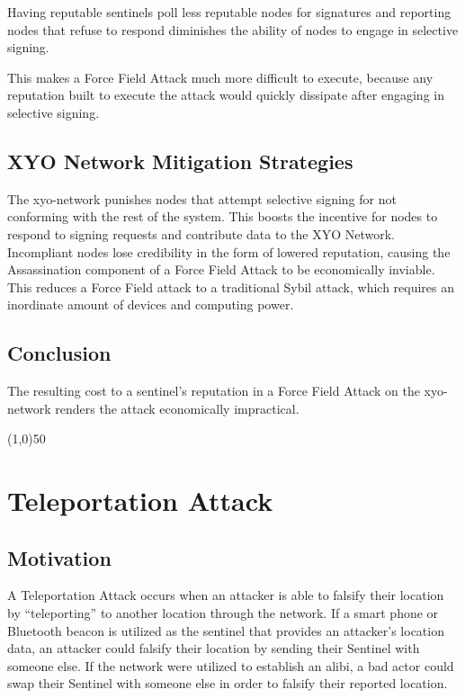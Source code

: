 \documentclass{article}
\begin{document}
Having reputable \Glspl{sentinel} poll less reputable nodes for signatures and reporting nodes that refuse to respond diminishes the ability of nodes to engage in selective signing.

This makes a Force Field Attack much more difficult to execute, because any reputation built to execute the attack would quickly dissipate after engaging in selective signing.

\subsection{XYO Network Mitigation Strategies}

The \Gls{xyo-network} punishes nodes that attempt selective signing for not conforming with the rest of the system. This boosts the incentive for nodes to respond to signing requests and contribute data to the XYO Network. Incompliant nodes lose credibility in the form of lowered reputation, causing the Assassination component of a Force Field Attack to be economically inviable. This reduces a Force Field attack to a traditional Sybil attack, which requires an inordinate amount of devices and computing power.

\subsection{Conclusion}

The resulting cost to a \Gls{sentinel}'s reputation in a Force Field Attack on the \Gls{xyo-network} renders the attack economically impractical.

\begin{center}
\line(1,0){50}
\end{center}

\section{Teleportation Attack}
\subsection{Motivation}
A Teleportation Attack occurs when an attacker is able to falsify their location by ``teleporting'' to another location through the network. If a smart phone or Bluetooth beacon is utilized as the \Gls{sentinel} that provides an attacker's location data, an attacker could falsify their location by sending their Sentinel with someone else. If the network were utilized to establish an alibi, a bad actor could swap their Sentinel with someone else in order to falsify their reported location. 
\end{document}
